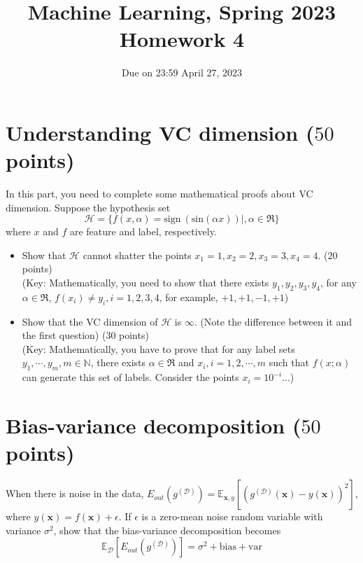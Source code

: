 \documentclass{article}
\begin{document}
\title{Machine Learning, Spring 2023\\Homework 4}
\date{Due on 23:59 April 27, 2023\\}
\maketitle




\section{Understanding VC dimension ($50$ points)}
In this part, you need to complete some mathematical proofs about VC dimension. Suppose the hypothesis set
\begin{equation*}
\mathcal{H} = \{f(x, \alpha) = \mathrm{sign} \ ( \mathrm{sin}(\alpha x))|, \alpha \in \Re \}
\end{equation*}
where $x$ and $f$ are feature and label, respectively.
\begin{itemize}
    \item Show that $\mathcal{H}$ cannot shatter the points $x_1 = 1, x_2 = 2, x_3 = 3, x_4 = 4$. ($20$ points) \\
    
    (Key: Mathematically, you need to show that there exists $y_1, y_2, y_3, y_4$, for any $\alpha \in \Re$, $f(x_i) \neq y_i, i = 1,2,3,4$, for example, $+1, +1, -1, +1$)\\
	\item Show that the VC dimension of $\mathcal{H}$ is $\infty$. (Note the difference between it and the first question) ($30$ points) \\
	
    (Key: Mathematically, you have to prove that for any label sets ${y_1 , \cdots , y_m}, m \in \mathbb{N} $, there exists $\alpha \in \Re$ and $x_i, i = 1,2,\cdots,m$
	such that $f(x; \alpha)$ can generate this set of labels. Consider the points $x_i = 10^{-i}$...)
\end{itemize} 



\section{Bias-variance decomposition ($50$ points)}
\label{problem1}
When there is noise in the data, $E_{out}(g^{(\mathcal{D})}) = \mathbb{E}_{\mathbf{x},y} \left[ (g^{(\mathcal{D})}(\mathbf{x}) - y(\mathbf{x}))^2\right]$, where $y(\mathbf{x}) = f(\mathbf{x}) + \epsilon$. If $\epsilon$ is a zero-mean noise random variable with variance $\sigma^2$, show that the bias-variance decomposition becomes 
\begin{equation*}
    \mathbb{E}_{\mathcal{D}}\left[ E_{out}(g^{(\mathcal{D})})\right] = \sigma^2 + \text{bias} + \text{var}
\end{equation*}
\end{document}
